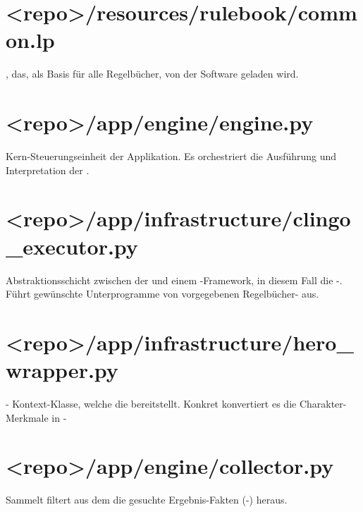 \begin{landscape}
    \section{<repo>/resources/rulebook/common.lp}\label{sec:common.lp}
    , das, als Basis für alle Regelbücher, von der Software geladen wird.
    \vspace{-1em}

    \section{<repo>/app/engine/engine.py}\label{sec:engine.py}
    Kern-Steuerungseinheit der Applikation.
    Es orchestriert die Ausführung und Interpretation der .
    \vspace{-1em}

    \section{<repo>/app/infrastructure/clingo\_executor.py}\label{sec:clingo-executor.py}
    Abstraktionsschicht zwischen der  und einem -Framework, in diesem Fall die -.
    Führt gewünschte Unterprogramme von vorgegebenen Regelbücher- aus.
    \vspace{-1em}

    \section{<repo>/app/infrastructure/hero\_wrapper.py}\label{sec:hero-wrapper.py}
    - Kontext-Klasse, welche die  bereitstellt.
    Konkret konvertiert es die Charakter-Merkmale in -
    \vspace{-1em}

    \section{<repo>/app/engine/collector.py}\label{sec:collector.py}
    Sammelt \bzw filtert aus dem  die gesuchte Ergebnis-Fakten (-) heraus.
    \vspace{-1em}


\end{landscape}
